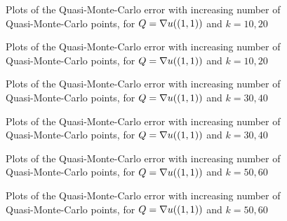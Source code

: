 \begin{figure}[h]
    \centering
    
    \caption{Plots of the Quasi-Monte-Carlo error with increasing number of Quasi-Monte-Carlo points, for $Q=\nabla u((1,1))$ and $k=10,20$ \label{fig:qmcgradient_top_right10}}
  \end{figure}
\begin{figure}[h]
  \centering

\caption{Plots of the Quasi-Monte-Carlo error with increasing number of Quasi-Monte-Carlo points, for $Q=\nabla u((1,1))$ and $k=10,20$ \label{fig:qmcgradient_top_right20}}
\end{figure}
\begin{figure}[h]
    \centering
    
    \caption{Plots of the Quasi-Monte-Carlo error with increasing number of Quasi-Monte-Carlo points, for $Q=\nabla u((1,1))$ and $k=30,40$ \label{fig:qmcgradient_top_right30}}
  \end{figure}
\begin{figure}[h]
  \centering
  
\caption{Plots of the Quasi-Monte-Carlo error with increasing number of Quasi-Monte-Carlo points, for $Q=\nabla u((1,1))$ and $k=30,40$ \label{fig:qmcgradient_top_right0}}
\end{figure}
\begin{figure}[h]
    \centering
    
    \caption{Plots of the Quasi-Monte-Carlo error with increasing number of Quasi-Monte-Carlo points, for $Q=\nabla u((1,1))$ and $k=50,60$ \label{fig:qmcgradient_top_right50}}
  \end{figure}
\begin{figure}[h]
  \centering

\caption{Plots of the Quasi-Monte-Carlo error with increasing number of Quasi-Monte-Carlo points, for $Q=\nabla u((1,1))$ and $k=50,60$ \label{fig:qmcgradient_top_right60}}
\end{figure}

